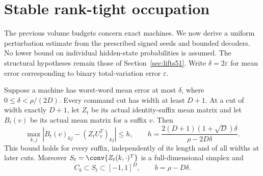 \section{Stable rank-tight occupation}\label{sec:stable51}
The previous volume budgets concern exact machines. We now derive a
uniform perturbation estimate from the prescribed signed seeds and
bounded decoders. No lower bound on individual hidden-state
probabilities is assumed. The structural hypotheses remain those of
Section~\ref{sec:lifts51}. Write $\delta=2\varepsilon$ for mean
error corresponding to binary total-variation error $\varepsilon$.

\begin{lemma}
\label{lem:anchor51}
Suppose a machine has worst-word mean error at most $\delta$, where
$0\le\delta<\rho/(2D)$. Every command cut has width at least $D+1$.
At a cut of width exactly $D+1$, let $Z_t$ be its actual identity-suffix
mean matrix and let $B_t(v)$ be its actual mean matrix for a suffix
$v$. Then
\begin{equation}\label{eq:row-stability51}
 \max_{k,j}|B_t(v)_{kj}-(Z_tU_v^T)_{kj}|
 \le h,\qquad
 h=\frac{2(D+1)(1+\sqrt D)\delta}{\rho-2D\delta}.
\end{equation}
This bound holds for every suffix, independently of its length and of
all widths at later cuts. Moreover $S_t=\conv\{Z_t(k,\cdot)^T\}$
is a full-dimensional simplex and
\begin{equation}\label{eq:inner-stability51}
 C_b\subset S_t\subset[-1,1]^D,\qquad b=\rho-D\delta.
\end{equation}
\end{lemma}
